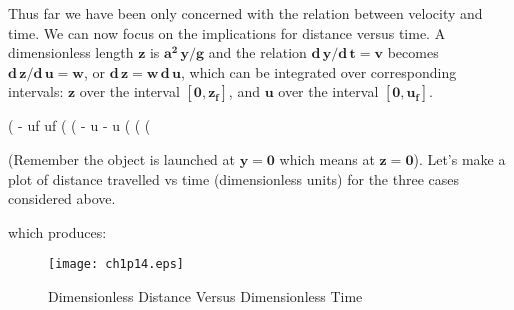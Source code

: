 \documentclass[11pt]{article}
\begin{document}
\noindent Thus far we have been only concerned with
  the relation between velocity and time. 
We can now focus on the implications for distance versus time.
A dimensionless length $\mathbf{z}$ is $\mathbf{a^{2} \,y/g}$ and the relation
  $\mathbf{d\,y/d\,t = v}$ becomes $\mathbf{d\,z/d\,u = w}$, or $\mathbf{d\,z = w\,d\,u}$, which can
  be integrated over corresponding intervals: $\mathbf{z}$ over the interval $\mathbf{[0, z_{f}]}$,
  and $\mathbf{u}$ over the interval $\mathbf{[0, u_{f}]}$.
\begin{myVerbatim}
(%
                            - uf            uf
(%
(%
                            - u             - u
(%
(%
(%
\end{myVerbatim}
(Remember the object is launched at $\mathbf{y = 0}$ which means at $\mathbf{z = 0}$).
Let's make a plot of distance travelled vs time (dimensionless units)
  for the three cases considered above.
\noindent which produces:
\smallskip
\begin{figure} [h]  
   \centerline{\texttt{[image: ch1p14.eps]} }
	\caption{Dimensionless Distance Versus Dimensionless Time }
\end{figure}


\newpage
\end{document}

